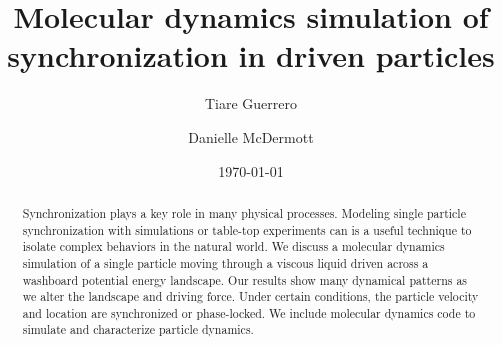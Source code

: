 \documentclass[twocolumn,preprintnumbers,amsmath,amssymb,aps,prx]{revtex4}
\begin{document}

\title{Molecular dynamics simulation of synchronization in driven particles}

\author{Tiare Guerrero}

\author{Danielle McDermott}

\date{\today}

\begin{abstract}
  Synchronization
  plays a key role in many physical processes.
  Modeling 
  single particle
  synchronization 
  with simulations or table-top experiments
  can is a useful technique to isolate
  complex behaviors %
  in the natural world.
  We discuss a %
  molecular dynamics simulation
  of a single particle
  moving through
  a viscous liquid
  driven 
  across a washboard potential energy landscape.
  Our results show many dynamical patterns
  as we alter the landscape and driving force.
  Under certain conditions,
  the particle velocity and location
  are synchronized or 
  phase-locked.
  We include molecular dynamics code %
  to simulate and characterize
  particle dynamics.
\end{abstract}
\end{document}
